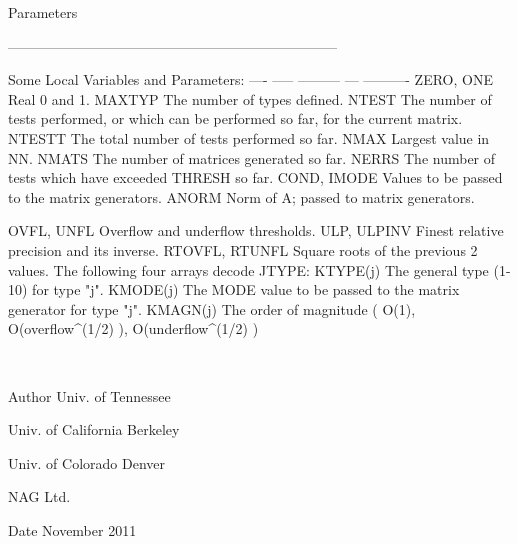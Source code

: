 \begin{DoxyParams}[1]{Parameters}
\begin{DoxyVerb}
-----------------------------------------------------------------------

       Some Local Variables and Parameters:
       ---- ----- --------- --- ----------
       ZERO, ONE       Real 0 and 1.
       MAXTYP          The number of types defined.
       NTEST           The number of tests performed, or which can
                       be performed so far, for the current matrix.
       NTESTT          The total number of tests performed so far.
       NMAX            Largest value in NN.
       NMATS           The number of matrices generated so far.
       NERRS           The number of tests which have exceeded THRESH
                       so far.
       COND, IMODE     Values to be passed to the matrix generators.
       ANORM           Norm of A; passed to matrix generators.

       OVFL, UNFL      Overflow and underflow thresholds.
       ULP, ULPINV     Finest relative precision and its inverse.
       RTOVFL, RTUNFL  Square roots of the previous 2 values.
               The following four arrays decode JTYPE:
       KTYPE(j)        The general type (1-10) for type "j".
       KMODE(j)        The MODE value to be passed to the matrix
                       generator for type "j".
       KMAGN(j)        The order of magnitude ( O(1),
                       O(overflow^(1/2) ), O(underflow^(1/2) )\end{DoxyVerb}
 \\
\hline
\end{DoxyParams}
\begin{DoxyAuthor}{Author}
Univ. of Tennessee 

Univ. of California Berkeley 

Univ. of Colorado Denver 

N\+A\+G Ltd. 
\end{DoxyAuthor}
\begin{DoxyDate}{Date}
November 2011 
\end{DoxyDate}
\hypertarget{group__double__eig_ga9fcde518d0efadd400e7ddf07235f188}{}
